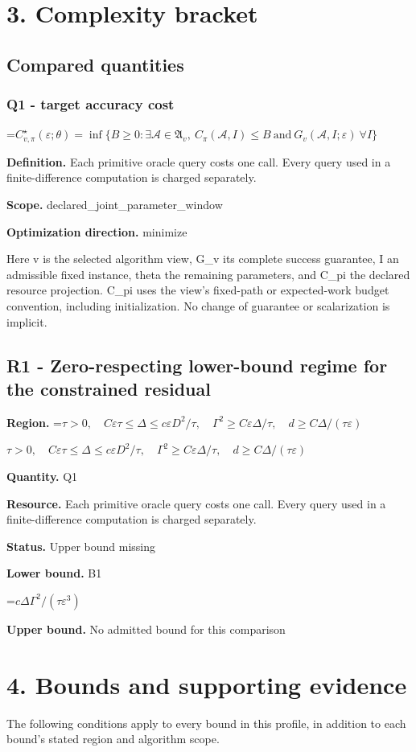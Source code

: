 \documentclass[10pt,a4paper]{article}
\newcommand{\AtlasMath}[1]{\par\begingroup\centering\setbox0=\hbox{$\displaystyle #1$}\ifdim\wd0>1.4\linewidth\typeout{ATLAS WIDE FORMULA: \the\wd0}\fi\ifdim\wd0>\linewidth\resizebox{\linewidth}{!}{\box0}\else\box0\fi\par\endgroup}
\newcommand{\AtlasInlineMath}[1]{\begingroup\setbox0=\hbox{$#1$}\ifdim\wd0>.4\linewidth\endgroup\AtlasMath{#1}\else\endgroup$#1$\fi}
\begin{document}
\section{3. Complexity bracket}
\subsection{Compared quantities}
\subsubsection{Q1 - target accuracy cost}
\AtlasMath{C^\star_{v,\pi}(\varepsilon;\theta)=\inf\{B\ge0:\exists\mathcal A\in\mathfrak A_v,\ C_\pi(\mathcal A,I)\le B\ \text{and}\ G_v(\mathcal A,I;\varepsilon)\ \forall I\}}
\textbf{Definition.} Each primitive oracle query costs one call. Every query used in a finite-difference computation is charged separately.

\textbf{Scope.} declared\_joint\_parameter\_window

\textbf{Optimization direction.} minimize

Here v is the selected algorithm view, G\_v its complete success guarantee, I an admissible fixed instance, theta the remaining parameters, and C\_pi the declared resource projection. C\_pi uses the view's fixed-path or expected-work budget convention, including initialization. No change of guarantee or scalarization is implicit.

\subsection{R1 - Zero-respecting lower-bound regime for the constrained residual}
\textbf{Region.} \AtlasInlineMath{\tau>0,\quad C\varepsilon\tau\le\Delta\le c\varepsilon D^2/\tau,\quad\Gamma^2\ge C\varepsilon\Delta/\tau,\quad d\ge C\Delta/(\tau\varepsilon)}

\textbf{Quantity.} Q1

\textbf{Resource.} Each primitive oracle query costs one call. Every query used in a finite-difference computation is charged separately.

\textbf{Status.} Upper bound missing

\textbf{Lower bound.} B1

\AtlasMath{c\Delta\Gamma^2/(\tau\varepsilon^3)}
\textbf{Upper bound.} No admitted bound for this comparison

\section{4. Bounds and supporting evidence}
The following conditions apply to every bound in this profile, in addition to each bound's stated region and algorithm scope.
\end{document}
